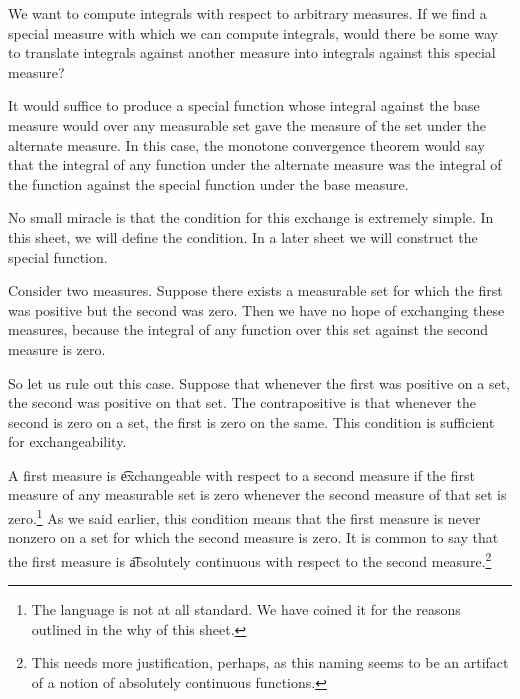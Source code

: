 

We want to compute integrals with respect to arbitrary measures.
If we find a special measure with which we can compute integrals, would there be some way to translate integrals against another measure into integrals against this special measure?

It would suffice to produce a special function
whose integral against the base measure
would over any measurable set gave
the measure of the set under the alternate
measure.
In this case, the monotone convergence
theorem would say that the integral of
any function under the alternate
measure was the integral of the function
against the special function under the
base measure.

No small miracle is that the condition
for this exchange is extremely simple.
In this sheet, we will define the
condition. In a later sheet we will
construct the special function.


Consider two measures.
Suppose there exists
a measurable set for which the first
was positive but the second was zero.
Then we have no hope of exchanging
these measures, because the integral
of any function over this set against
the second measure is zero.

So let us rule out this case.
Suppose that whenever the
first was positive on a set,
the second was positive on that set.
The contrapositive is that
whenever the second is zero
on a set, the first is zero on the same.
This condition
is sufficient for exchangeability.

A first measure is \t{exchangeable} with respect to a second measure if the first measure of any measurable set is zero whenever the second measure of that set is zero.\footnote{The language  is not at all standard. We have coined it for the reasons outlined in the why of this sheet.}
As we said earlier, this condition means that the first measure is never nonzero on a set for which the second measure is zero.
It is common to say that the first measure is \t{absolutely continuous} with respect to the second measure.\footnote{This needs more justification, perhaps, as this naming seems to be an artifact of a notion of absolutely continuous functions.}


